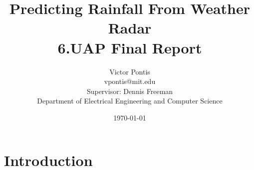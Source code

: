 \documentclass[12pt]{article}
\title{Predicting Rainfall From Weather Radar\\
6.UAP Final Report
}
\author{
Victor Pontis\\
vpontis@mit.edu\\
Supervisor: Dennis Freeman\\
Department of Electrical Engineering and Computer Science
}
\date{\today}
\begin{document}
\maketitle

\section{Introduction}
\end{document}
